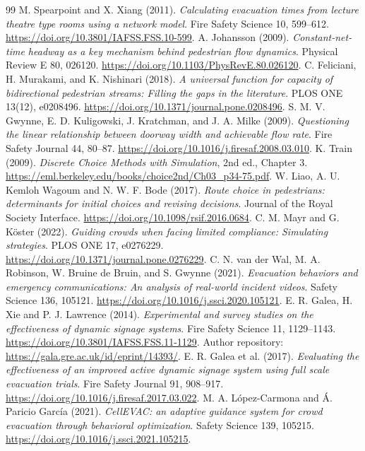 \documentclass[11pt,a4paper]{article}
\begin{document}
\begin{thebibliography}{99}
 M. Spearpoint and X. Xiang (2011). \emph{Calculating evacuation times from lecture theatre type rooms using a network model}. Fire Safety Science 10, 599--612. \url{https://doi.org/10.3801/IAFSS.FSS.10-599}.
 A. Johansson (2009). \emph{Constant-net-time headway as a key mechanism behind pedestrian flow dynamics}. Physical Review E 80, 026120. \url{https://doi.org/10.1103/PhysRevE.80.026120}.
 C. Feliciani, H. Murakami, and K. Nishinari (2018). \emph{A universal function for capacity of bidirectional pedestrian streams: Filling the gaps in the literature}. PLOS ONE 13(12), e0208496. \url{https://doi.org/10.1371/journal.pone.0208496}.
 S. M. V. Gwynne, E. D. Kuligowski, J. Kratchman, and J. A. Milke (2009). \emph{Questioning the linear relationship between doorway width and achievable flow rate}. Fire Safety Journal 44, 80--87. \url{https://doi.org/10.1016/j.firesaf.2008.03.010}.
 K. Train (2009). \emph{Discrete Choice Methods with Simulation}, 2nd ed., Chapter 3. \url{https://eml.berkeley.edu/books/choice2nd/Ch03_p34-75.pdf}.
 W. Liao, A. U. Kemloh Wagoum and N. W. F. Bode (2017). \emph{Route choice in pedestrians: determinants for initial choices and revising decisions}. Journal of the Royal Society Interface. \url{https://doi.org/10.1098/rsif.2016.0684}.
 C. M. Mayr and G. K\"oster (2022). \emph{Guiding crowds when facing limited compliance: Simulating strategies}. PLOS ONE 17, e0276229. \url{https://doi.org/10.1371/journal.pone.0276229}.
 C. N. van der Wal, M. A. Robinson, W. Bruine de Bruin, and S. Gwynne (2021). \emph{Evacuation behaviors and emergency communications: An analysis of real-world incident videos}. Safety Science 136, 105121. \url{https://doi.org/10.1016/j.ssci.2020.105121}.
 E. R. Galea, H. Xie and P. J. Lawrence (2014). \emph{Experimental and survey studies on the effectiveness of dynamic signage systems}. Fire Safety Science 11, 1129--1143. \url{https://doi.org/10.3801/IAFSS.FSS.11-1129}. Author repository: \url{https://gala.gre.ac.uk/id/eprint/14393/}.
 E. R. Galea et al. (2017). \emph{Evaluating the effectiveness of an improved active dynamic signage system using full scale evacuation trials}. Fire Safety Journal 91, 908--917. \url{https://doi.org/10.1016/j.firesaf.2017.03.022}.
 M. A. L\'opez-Carmona and \'A. Paricio Garc\'ia (2021). \emph{CellEVAC: an adaptive guidance system for crowd evacuation through behavioral optimization}. Safety Science 139, 105215. \url{https://doi.org/10.1016/j.ssci.2021.105215}.

\end{thebibliography}
\end{document}
